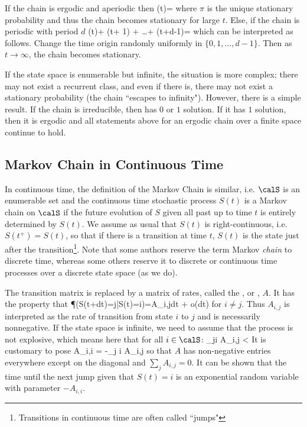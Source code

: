 If the chain is ergodic and aperiodic then
 \ben
 \pi(t)= \pi
\een where $\pi$ is the unique stationary probability and thus
the chain becomes stationary for large $t$. Else, if the chain
is periodic with period $d$
 \ben
 \lp \pi(t)+ \pi(t+ 1) + \ldots + \pi(t+d-1)\rp= \pi
\een which can be interpreted as follows. Change the time
origin randomly uniformly in $\{0,1,\ldots,d-1\}$. Then as $t
\to {\infty}$, the chain becomes stationary.


If the state space is enumerable but infinite, the situation is
more complex; there may not exist a recurrent class, and even
if there is, there may not exist a stationary probability (the
chain ``escapes to infinity"). However, there is a simple
result. If the chain is irreducible, then 
has $0$ or $1$ solution. If it has $1$ solution, then it is
ergodic and all statements above for an ergodic chain over a
finite space continue to hold.
\subsection{Markov Chain in Continuous Time}
In continuous time, the definition of the Markov Chain is
similar, i.e. $\calS$ is an enumerable set and the continuous
time stochastic process $S(t)$ is a Markov chain on $\calS$ if
the future evolution of $S$ given all past up to time $t$ is
entirely determined by $S(t)$. We assume as usual that $S(t)$
is right-continuous, i.e. $S(t^+)=S(t)$, so that if there is a
transition at time $t$, $S(t)$ is the state just after the
transition\footnote{Transitions in continuous time are often
called ``jumps"}. Note that some authors reserve the term
Markov \emph{chain} to discrete time, whereas some others
reserve it to discrete or continuous time processes over a
discrete state space (as we do).


The transition matrix is replaced by a matrix of rates, called
the , or , $A$.
It has the property that
 \be
 \P(S(t+dt)=j|S(t)=i)=A_{i,j}dt + o(dt)
\ee for $i\neq j$. Thus $A_{i,j }$ is interpreted as the rate
of transition from state $i$ to $j$ and is necessarily
nonnegative. If the state space is infinite, we need to assume
that the process is not explosive, which means here that for
all $i \in \calS$:
 \be
 \sum_{j\neq i} A_{i,j} < {\infty}
 \ee
 It is customary to pose
 \be
 A_{i,i} = -\sum_{j \neq i} A_{i,j}
 \ee
so that $A$ has non-negative entries everywhere except on the
diagonal and $\sum_j A_{i,j}=0$. It can be shown that the time
until the next jump given that $S(t)=i$ is an exponential
random variable with parameter $-A_{i,i}$.

